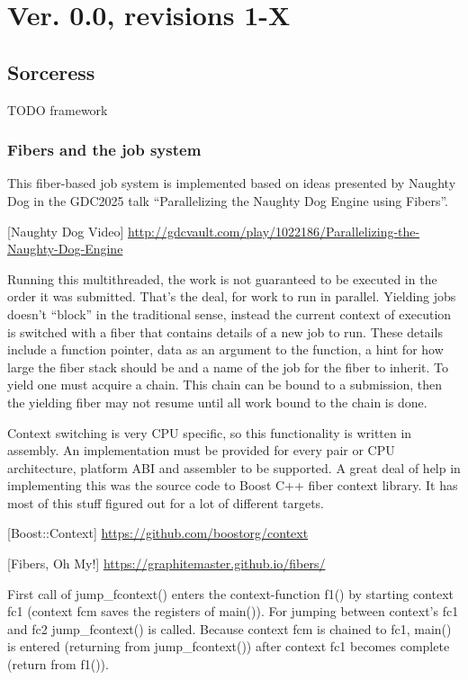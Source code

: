 \section{Ver. 0.0, revisions 1-X}

\subsection{Sorceress}
TODO framework

\subsubsection{Fibers and the job system}
This fiber-based job system is implemented based on ideas presented by Naughty Dog
in the GDC2025 talk ``Parallelizing the Naughty Dog Engine using Fibers''.

[Naughty Dog Video] 
\url{http://gdcvault.com/play/1022186/Parallelizing-the-Naughty-Dog-Engine}

Running this multithreaded, the work is not guaranteed to be executed in the order it was submitted.
That's the deal, for work to run in parallel. 
Yielding jobs doesn't ``block'' in the traditional sense, instead the current context of execution
is switched with a fiber that contains details of a new job to run.
These details include a function pointer, data as an argument to the function, 
a hint for how large the fiber stack should be and a name of the job for the fiber to inherit.
To yield one must acquire a chain. 
This chain can be bound to a submission, then the yielding fiber may not resume until all work bound to the chain is done.

Context switching is very CPU specific, so this functionality is written in assembly.
An implementation must be provided for every pair or CPU architecture, platform ABI and assembler to be supported.
A great deal of help in implementing this was the source code to Boost C++ fiber context library.
It has most of this stuff figured out for a lot of different targets.

[Boost::Context]
\url{https://github.com/boostorg/context}

[Fibers, Oh My!]
\url{https://graphitemaster.github.io/fibers/}

First call of jump\_fcontext() enters the context-function f1() by starting context fc1 (context fcm saves the registers of main()). 
For jumping between context's fc1 and fc2 jump\_fcontext() is called. 
Because context fcm is chained to fc1, main() is entered (returning from jump\_fcontext()) after context fc1 becomes complete (return from f1()).

